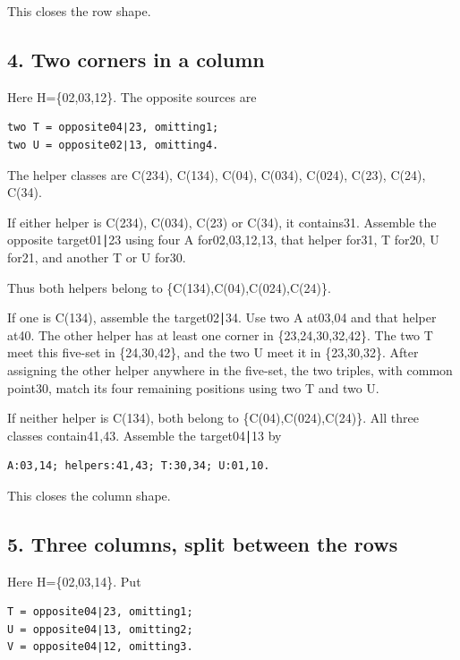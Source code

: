 \documentclass[
  10pt,
]{article}
\begin{document}
This closes the row shape.

\hypertarget{two-corners-in-a-column}{%
\subsection*{4. Two corners in a column}\label{two-corners-in-a-column}}

Here H=\{02,03,12\}. The opposite sources are

\begin{verbatim}
two T = opposite04∣23, omitting1;
two U = opposite02∣13, omitting4.
\end{verbatim}

The helper classes are C(234), C(134), C(04), C(034), C(024), C(23),
C(24), C(34).

If either helper is C(234), C(034), C(23) or C(34), it contains31.
Assemble the opposite target01∣23 using four A for02,03,12,13, that
helper for31, T for20, U for21, and another T or U for30.

Thus both helpers belong to \{C(134),C(04),C(024),C(24)\}.

If one is C(134), assemble the target02∣34. Use two A at03,04 and that
helper at40. The other helper has at least one corner in
\{23,24,30,32,42\}. The two T meet this five-set in \{24,30,42\}, and
the two U meet it in \{23,30,32\}. After assigning the other helper
anywhere in the five-set, the two triples, with common point30, match
its four remaining positions using two T and two U.

If neither helper is C(134), both belong to \{C(04),C(024),C(24)\}. All
three classes contain41,43. Assemble the target04∣13 by

\begin{verbatim}
A:03,14; helpers:41,43; T:30,34; U:01,10.
\end{verbatim}

This closes the column shape.

\hypertarget{three-columns-split-between-the-rows}{%
\subsection*{5. Three columns, split between the
rows}\label{three-columns-split-between-the-rows}}

Here H=\{02,03,14\}. Put

\begin{verbatim}
T = opposite04∣23, omitting1;
U = opposite04∣13, omitting2;
V = opposite04∣12, omitting3.
\end{verbatim}
\end{document}
